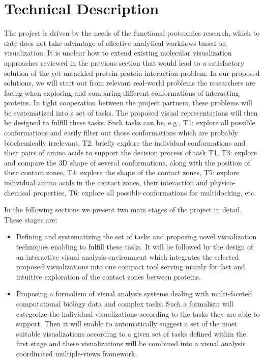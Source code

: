 \documentclass[11pt,a4paper,titlepage,oneside,onecolumn]{article}
\begin{document}
\section{Technical Description}
\label{sec:TechnicalDescription}
The project is driven by the needs of the functional proteomics research, which to date does not take advantage of effective analytical workflows based on visualization.
It is unclear how to extend existing molecular visualization approaches reviewed in the previous section that would lead to a satisfactory solution of the yet untackled protein-protein interaction problem.
In our proposed solutions, we will start out from relevant real-world problems the researchers are facing when exploring and comparing different conformations of interacting proteins.
In tight cooperation between the project partners, these problems will be systematized into a set of tasks. 
The proposed visual representations will then be designed to fulfill these tasks.
Such tasks can be, e.g., T1: explore all possible conformations and easily filter out those conformations which are probably biochemically irrelevant, T2: briefly explore the individual conformations and their pairs of amino acids to support the decision process of task T1, T3: explore and compare the 3D shape of several conformations, along with the position of their contact zones, T4: explore the shape of the contact zones, T5: explore individual amino acids in the contact zones, their interaction and physico-chemical properties, T6: explore all possible conformations for multidocking, etc.

In the following sections we present two main stages of the project in detail. These stages are:
\begin{itemize}
\item Defining and systematizing the set of tasks and proposing novel visualization techniques enabling to fulfill these tasks. It will be followed by the design of an interactive visual analysis environment which integrates the selected proposed visualizations into one compact tool serving mainly for fast and intuitive exploration of the contact zones between proteins. %
\item Proposing a formalism of visual analysis systems dealing with multi-faceted computational biology data and complex tasks. Such a formalism will categorize the individual visualizations according to the tasks they are able to support. Then it will enable to automatically suggest a set of the most suitable visualizations according to a given set of tasks defined within the first stage and these visualizations will be combined into a visual analysis coordinated multiple-views framework.
\end{itemize}
\end{document}
